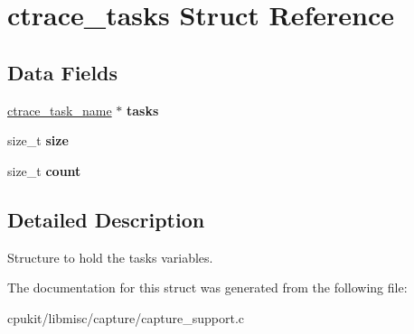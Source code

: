 \hypertarget{structctrace__tasks}{}\section{ctrace\+\_\+tasks Struct Reference}
\label{structctrace__tasks}
\subsection*{Data Fields}
\begin{DoxyCompactItemize}
\item 
\mbox{\label{structctrace__tasks_a9697894b385c9c32e6d965afdbcc02df}} 
\mbox{\hyperlink{structctrace__task__name}{ctrace\+\_\+task\+\_\+name}} $\ast$ {\bfseries tasks}
\item 
\mbox{\label{structctrace__tasks_a1bf20d6c9b4ab776e965ec64adc829f0}} 
size\+\_\+t {\bfseries size}
\item 
\mbox{\label{structctrace__tasks_a96b3002c2ff3962fe3419304d1387cf3}} 
size\+\_\+t {\bfseries count}
\end{DoxyCompactItemize}


\subsection{Detailed Description}
Structure to hold the tasks variables. 

The documentation for this struct was generated from the following file\+:\begin{DoxyCompactItemize}
\item 
cpukit/libmisc/capture/capture\+\_\+support.\+c\end{DoxyCompactItemize}
